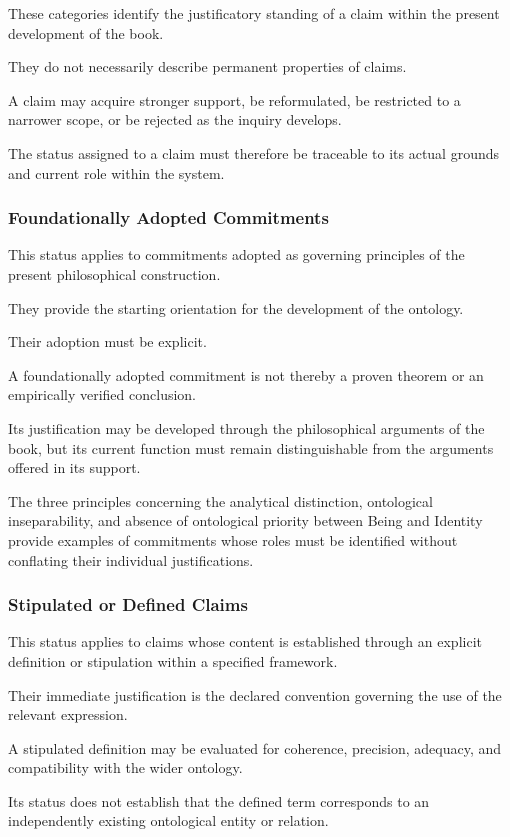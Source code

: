 These categories identify
the justificatory standing
of a claim within
the present development
of the book.

They do not necessarily
describe permanent
properties of claims.

A claim may acquire
stronger support,
be reformulated,
be restricted to
a narrower scope,
or be rejected
as the inquiry
develops.

The status assigned
to a claim must
therefore be traceable
to its actual grounds
and current role
within the system.

\subsubsection{Foundationally Adopted Commitments}

This status applies
to commitments adopted
as governing principles
of the present
philosophical construction.

They provide the
starting orientation
for the development
of the ontology.

Their adoption
must be explicit.

A foundationally
adopted commitment
is not thereby
a proven theorem
or an empirically
verified conclusion.

Its justification
may be developed
through the philosophical
arguments of the
book, but its
current function
must remain distinguishable
from the arguments
offered in its support.

The three principles
concerning the
analytical distinction,
ontological inseparability,
and absence of
ontological priority
between Being and
Identity provide
examples of commitments
whose roles must
be identified
without conflating
their individual
justifications.

\subsubsection{Stipulated or Defined Claims}

This status applies
to claims whose
content is established
through an explicit
definition or
stipulation within
a specified framework.

Their immediate
justification is
the declared
convention governing
the use of the
relevant expression.

A stipulated
definition may
be evaluated
for coherence,
precision, adequacy,
and compatibility
with the wider
ontology.

Its status does
not establish
that the defined
term corresponds
to an independently
existing ontological
entity or relation.

